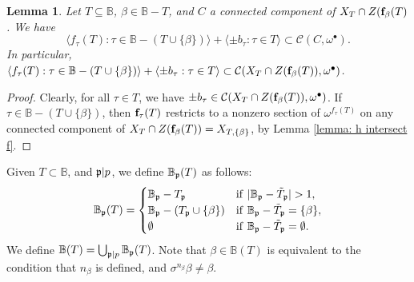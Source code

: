 \documentclass[11pt,pdflatex]{amsart}
\theoremstyle{plain}
\newtheorem{lemma}[theorem]{Lemma}
\theoremstyle{definition}
\theoremstyle{plain}
\theoremstyle{definition}
\theoremstyle{remark}
\numberwithin{equation}{section}
\numberwithin{figure}{section} \numberwithin{table}{subsection}
\newcommand{\gerp}{{\frak{p}}}
\newcommand{\calC}{{\mathcal{C}}}
\def\BB{\mathbb{B}}
\begin{document}
\begin{lemma}\label{lemma: survive} Let $T \subseteq \BB$, $\beta \in \BB-T$, and $C$ a connected component of $X_T \cap Z({\bf f}_\beta(T)$. We have $$\langle f_\tau(T): \tau \in \BB-(T \cup \{\beta\}) \rangle + \langle \pm b_\tau: \tau \in T \rangle \subset  \calC(C, \omega^\bullet).$$In particular, $\langle f_\tau(T): \tau \in \BB-(T \cup \{\beta\}) \rangle + \langle \pm b_\tau: \tau \in T \rangle \subset  \calC(X_T \cap Z({\bf f}_\beta(T)), \omega^\bullet)$.
\end{lemma}
\begin{proof} Clearly, for all $\tau \in T$, we have $\pm b_\tau \in \calC(X_T \cap Z({\bf f}_\beta(T)), \omega^\bullet)$. If $\tau  \in \BB-(T \cup \{\beta\})$, then ${\bf f}_\tau(T)$ restricts to a nonzero section of $\omega^{f_\tau(T)}$ on any connected component of $X_T \cap Z({\bf f}_\beta(T))=X_{T,\{\beta\}}$, by Lemma \ref{lemma: h intersect f}.
\end{proof}



 Given $T \subset \BB$, and $\gerp|p$, we define  $\BB_\gerp(T)$ as follows:
 $$\BB_\gerp(T)=\begin{cases} \BB_\gerp-T_\gerp & {\rm if}\ |\BB_\gerp-\tilde{T}_\gerp| >1, \\
  \BB_\gerp-(T_\gerp \cup \{\beta\}) & {\rm if}\ \BB_\gerp-\tilde{T}_\gerp=\{\beta\}, \\
  \emptyset & {\rm if}\ \BB_\gerp-\tilde{T}_\gerp=\emptyset.
 \end{cases}$$ 
We define $\BB(T)=\bigcup_{\gerp|p} \BB_\gerp(T)$. Note that $\beta \in \BB(T)$ is equivalent to the condition that 
$n_\beta$ is defined, and $\sigma^{n_\beta}\beta \neq \beta$.
\end{document}
